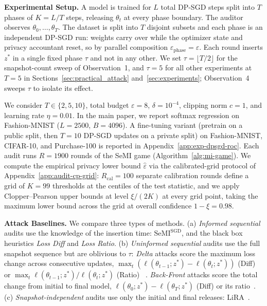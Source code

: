 \documentclass{article}
\theoremstyle{plain}
\theoremstyle{definition}
\theoremstyle{remark}
\newcommand{\SeMISGD}{\mathrm{SeMI}^{\mathrm{SGD}}}
\begin{document}
\textbf{Experimental Setup.} A model is trained for $L$ total DP-SGD steps split into $T$ phases of $K = L/T$ steps, releasing $\theta_t$ at every phase boundary. The auditor observes $\theta_0,\dots,\theta_T$. The dataset is split into $T$ disjoint subsets and each phase is an independent DP-SGD run: weights carry over while the optimizer state and privacy accountant reset, so by parallel composition $\varepsilon_{\mathrm{phase}} = \varepsilon$. Each round inserts $z^*$ in a single fixed phase $\tau$ and not in any other. We set $\tau = \lfloor T/2 \rfloor$ for the snapshot-count sweep of Observation~1, and $\tau = 5$ for all other experiments at $T = 5$ in Sections~\ref{sec:practical_attack} and~\ref{sec:experiments}; Observation~4 sweeps $\tau$ to isolate its effect.

We consider $T \in \{2, 5, 10\}$, total budget $\varepsilon = 8$, $\delta = 10^{-4}$, clipping norm $c = 1$, and learning rate $\eta = 0.01$. In the main paper, we report softmax regression on Fashion-MNIST ($L = 2500$, $B = 4096$). A fine-tuning variant (pretrain on a public split, then $T=10$ DP-SGD updates on a private split) on Fashion-MNIST, CIFAR-10, and Purchase-100 is reported in Appendix~\ref{app:exp-dpsgd-roc}.
Each audit runs $R = 1900$ rounds of the SeMI game (Algorithm~\ref{alg:mi-game}).
We compute the empirical privacy lower bound $\hat\varepsilon$ via the calibrated-grid protocol of Appendix~\ref{app:audit-cp-grid}: $R_{\mathrm{cal}} = 100$ separate calibration rounds define a grid of $K = 99$ thresholds at the centiles of the test statistic, and we apply Clopper--Pearson upper bounds at level $\xi/(2K)$ at every grid point, taking the maximum lower bound across the grid at overall confidence $1 - \xi = 0.98$.

\textbf{Attack Baselines.}\label{sec:exp_baselines} We compare three types of methods. (a) \emph{Informed sequential} audits use the knowledge of the insertion time: $\SeMISGD$, and the black box heuristics \emph{Loss Diff} and \emph{Loss Ratio}.
(b) \emph{Uninformed sequential} audits use the full snapshot sequence but are oblivious to $\tau$: \emph{Delta} attacks score the maximum loss change across consecutive updates, $\max_t (\ell(\theta_{t-1}; z^*) - \ell(\theta_t; z^*))$ (Diff) or $\max_t \ell(\theta_{t-1}; z^*) / \ell(\theta_t; z^*)$ (Ratio) ~\citep{jagielskiHowCombineMembershipInference2023}.
\emph{Back-Front} attacks score the total change from initial to final model, $\ell(\theta_0; z^*) - \ell(\theta_T; z^*)$ (Diff) or its ratio~\citep{jagielskiHowCombineMembershipInference2023}.
(c) \emph{Snapshot-independent} audits use only the initial and final releases: LiRA~\citep{carlini2022membership}.
\end{document}
